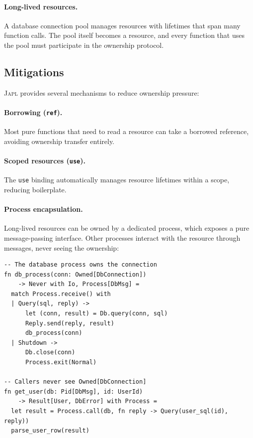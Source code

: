\documentclass[11pt]{article}
\newcommand{\JAPL}{\textsc{Japl}}
\begin{document}
\paragraph{Long-lived resources.}
A database connection pool manages resources with lifetimes that span
many function calls.  The pool itself becomes a resource, and every
function that uses the pool must participate in the ownership protocol.

\subsection{Mitigations}

\JAPL{} provides several mechanisms to reduce ownership pressure:

\paragraph{Borrowing (\texttt{ref}).}
Most pure functions that need to read a resource can take a borrowed
reference, avoiding ownership transfer entirely.

\paragraph{Scoped resources (\texttt{use}).}
The \texttt{use} binding automatically manages resource lifetimes
within a scope, reducing boilerplate.

\paragraph{Process encapsulation.}
Long-lived resources can be owned by a dedicated process, which
exposes a pure message-passing interface.  Other processes interact
with the resource through messages, never seeing the ownership:

\begin{lstlisting}[caption={Process encapsulation hides ownership},label={lst:encapsulation}]
-- The database process owns the connection
fn db_process(conn: Owned[DbConnection])
    -> Never with Io, Process[DbMsg] =
  match Process.receive() with
  | Query(sql, reply) ->
      let (conn, result) = Db.query(conn, sql)
      Reply.send(reply, result)
      db_process(conn)
  | Shutdown ->
      Db.close(conn)
      Process.exit(Normal)

-- Callers never see Owned[DbConnection]
fn get_user(db: Pid[DbMsg], id: UserId)
    -> Result[User, DbError] with Process =
  let result = Process.call(db, fn reply -> Query(user_sql(id), reply))
  parse_user_row(result)
\end{lstlisting}
\end{document}
